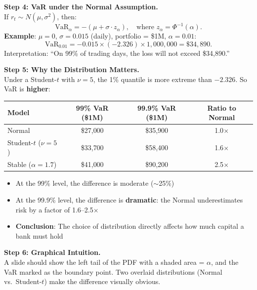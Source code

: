 \documentclass[11pt, a4paper]{article}
\theoremstyle{definition}
\begin{document}
\vspace{0.2cm}

\noindent\textbf{Step 4: VaR under the Normal Assumption.}\\
If $r_t \sim N(\mu, \sigma^2)$, then:
\[
  \text{VaR}_\alpha = -(\mu + \sigma \cdot z_\alpha), \quad \text{where } z_\alpha = \Phi^{-1}(\alpha).
\]
\textbf{Example}: $\mu = 0$, $\sigma = 0.015$ (daily), portfolio = \$1M, $\alpha = 0.01$:
\[
  \text{VaR}_{0.01} = -0.015 \times (-2.326) \times 1{,}000{,}000 = \$34{,}890.
\]
Interpretation: ``On 99\% of trading days, the loss will not exceed \$34{,}890.''

\vspace{0.2cm}

\noindent\textbf{Step 5: Why the Distribution Matters.}\\
Under a Student-$t$ with $\nu = 5$, the 1\% quantile is more extreme than $-2.326$. So VaR is \textbf{higher}:

\begin{center}
\renewcommand{\arraystretch}{1.2}
\begin{tabular}{l c c c}
\toprule
\textbf{Model} & \textbf{99\% VaR (\$1M)} & \textbf{99.9\% VaR (\$1M)} & \textbf{Ratio to Normal} \\
\midrule
Normal & \$27{,}000 & \$35{,}900 & 1.0$\times$ \\
Student-$t$ ($\nu=5$) & \$33{,}700 & \$58{,}400 & 1.6$\times$ \\
Stable ($\alpha=1.7$) & \$41{,}000 & \$90{,}200 & 2.5$\times$ \\
\bottomrule
\end{tabular}
\end{center}

\begin{itemize}
  \item At the 99\% level, the difference is moderate ($\sim$25\%)
  \item At the 99.9\% level, the difference is \textbf{dramatic}: the Normal underestimates risk by a factor of 1.6--2.5$\times$
  \item \textbf{Conclusion}: The choice of distribution directly affects how much capital a bank must hold
\end{itemize}

\noindent\textbf{Step 6: Graphical Intuition.}\\
A slide should show the left tail of the PDF with a shaded area = $\alpha$, and the VaR marked as the boundary point. Two overlaid distributions (Normal vs.\ Student-$t$) make the difference visually obvious.
\end{document}
